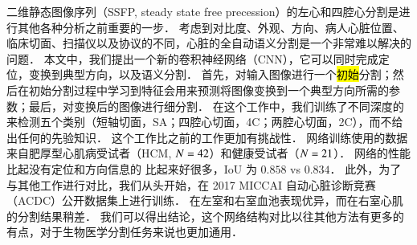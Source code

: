 
二维静态图像序列（SSFP, steady state free precession）的左心和四腔心分割是进行其他各种分析之前重要的一步．
考虑到对比度、外观、方向、病人心脏位置、临床切面、扫描仪以及协议的不同，心脏的全自动语义分割是一个非常难以解决的问题．
本文中，我们提出一个新的卷积神经网络（CNN），它可以同时完成定位，变换到典型方向，以及语义分割．
首先，对输入图像进行一个\hl{初始}分割；然后在初始分割过程中学习到特征会用来预测将图像变换到一个典型方向所需的参数；最后，对变换后的图像进行细分割．
在这个工作中，我们训练了不同深度的 \omeganet 来检测五个类别（短轴切面，SA；四腔心切面，4C；两腔心切面，2C），而不给出任何的先验知识．
这个工作比之前的工作更加有挑战性．
网络训练使用的数据来自肥厚型心肌病受试者（HCM, $N = 42{}$）和健康受试者（$N = 21{}$）．
网络的性能比起没有定位和方向信息的 \UNet{} 比起来好很多，IoU 为 $0.858$ vs $0.834$．
此外，为了与其他工作进行对比，我们从头开始，在 2017 MICCAI 自动心脏诊断竞赛（ACDC）公开数据集上进行训练．
\omeganet{} 在左室和右室血池表现优异，而在右室心肌的分割结果稍差．
我们可以得出结论，这个网络结构对比以往其他方法有更多的有点，对于生物医学分割任务来说也更加通用．

